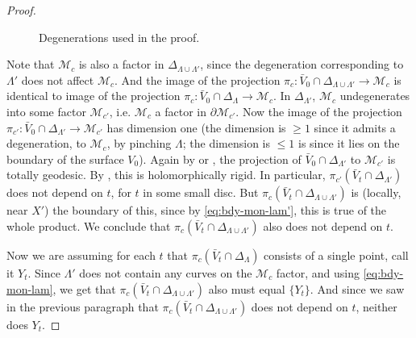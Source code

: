 \documentclass[11pt]{article}
\theoremstyle{plain}
\theoremstyle{definition}
\newcommand{\M}{\mathcal{M}}
\begin{document}
\begin{proof}
\begin{figure}
        \caption{ Degenerations used in the proof. 
        }
        \label{fig:degen
        }
      \end{figure}

      
    
    Note that $\M_c$ is also a factor in $\Delta_{\Lambda\cup \Lambda'}$, since the degeneration corresponding to $\Lambda'$ does not affect $\M_c$.  And the image of the projection $\pi_c: \bar V_0 \cap \Delta_{\Lambda \cup \Lambda'} \to \M_c$ is identical to image of the projection $\pi_c:\bar V_0 \cap \Delta_{\Lambda} \to \M_c$. 
    In $\Delta_{\Lambda'}$, $\M_c$ undegenerates into some factor $\M_{c'}$, i.e. $\M_c$ a factor in $\partial \M_{c'}$.   Now the image of the projection $\pi_{c'}: \bar V_0 \cap \Delta_{\Lambda'} \to \M_{c'}$ has dimension one (the dimension is $\ge 1$ since it admits a degeneration, to $\M_c$, by pinching $\Lambda$; the dimension is $\le 1$ is since it lies on the boundary of the surface $V_0$).   
    Again by \cite[Theorem 1.7]{bdr24} or \cite[Theorem 1.3]{aw24}, the projection of $\bar V_0 \cap \Delta_{\Lambda'}$ to $\M_{c'}$ is totally geodesic. 
    By \cite{mcmullen09}, %
    this is holomorphically rigid.  In particular, $\pi_{c'}(\bar V_t \cap \Delta_{\Lambda'})$ does not depend on $t$, for $t$ in some small disc.
    But $\pi_c(\bar V_t \cap \Delta_{\Lambda \cup \Lambda'})$ is (locally, near $X'$) the boundary of this, since by \eqref{eq:bdy-mon-lam'}, this is true of the whole product.
    We conclude that $\pi_c(\bar V_t \cap \Delta_{\Lambda \cup \Lambda'})$  also does not depend on $t$.  


    
    Now we are assuming for each $t$ that $\pi_c(\bar V_t \cap \Delta_{\Lambda})$ consists of a single point, call it $Y_t$. Since $\Lambda'$ does not contain any curves on the $\M_c$ factor, and using \eqref{eq:bdy-mon-lam}, we get that $\pi_c(\bar V_t \cap \Delta_{\Lambda \cup \Lambda'})$ also must equal $\{Y_t\}$.
    And since we saw in the previous paragraph that $\pi_c(\bar V_t \cap \Delta_{\Lambda \cup \Lambda'})$ does not depend on $t$, neither does $Y_t$.  


\end{proof}
\end{document}
